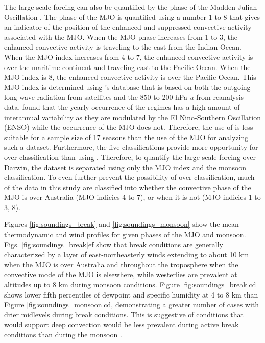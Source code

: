 \documentclass[journal abbreviation, manuscript]{copernicus}
\begin{document}
    The large scale forcing can also be quantified by the phase of the Madden-Julian Oscillation \citep{MaddenJulian1971}. The phase of the MJO is quantified using a number 1 to 8 that gives an indicator of the position of the enhanced and suppressed convective activity associated with the MJO. When the MJO phase increases from 1 to 3, the enhanced convective activity is traveling to the east from the Indian Ocean. When the MJO index increases from 4 to 7, the enhanced convective activity is over the maritime continent and traveling east to the Pacific Ocean. When the MJO index is 8, the enhanced convective activity is over the Pacific Ocean. This MJO index is determined using \cite{WheelerHendon2004}'s database that is based on both the outgoing long-wave radiation from satellites and the 850 to 200 hPa $u$ from reanalysis data. \cite{RauniyarandWalsh2016} found that the yearly occurrence of the  \cite{Popeetal2008} regimes has a high amount of interannual variability as they are modulated by the El Nino-Southern Oscillation (ENSO) while the occurrence of the MJO does not. Therefore, the use of \cite{Popeetal2008} is less suitable for a sample size of 17 seasons than the use of the MJO for analyzing such a dataset. Furthermore, the five classifications provide more opportunity for over-classification than using \cite{Dros1996}. Therefore, to quantify the large scale forcing over Darwin, the dataset is separated using only the MJO index and the \cite{Dros1996} monsoon classification. To even further prevent the possibility of over-classification, much of the data in this study are classified into whether the convective phase of the MJO is over Australia (MJO indicies 4 to 7), or when it is not (MJO indicies 1 to 3, 8). 
    
    Figures \ref{fig:soundings_break} and \ref{fig:soundings_monsoon} show the mean thermodynamic and wind profiles for given phases of the MJO and monsoon. Figs. \ref{fig:soundings_break}ef show that break conditions are generally characterized by a layer of east-northeasterly winds extending to about 10 km when the MJO is over Australia and throughout the troposphere when the convective mode of the MJO is elsewhere, while westerlies are prevalent at altitudes up to 8 km during monsoon conditions. Figure \ref{fig:soundings_break}cd shows lower fifth percentiles of dewpoint and specific humidity at 4 to 8 km than Figure \ref{fig:soundings_monsoon}cd, demonstrating a greater number of cases with drier midlevels during break conditions. This is suggestive of conditions that would support deep convection would be less prevalent during active break conditions than during the monsoon \citep{Hagosetal2013}. 
    
\end{document}
